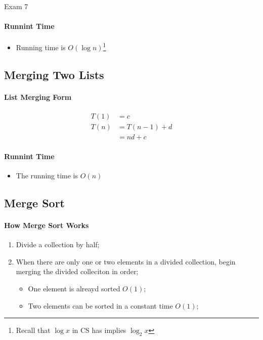 \documentclass{note}
\begin{document}
\begin{note}{Exam 7}
    \paragraph{Runnint Time}
    \begin{itemize}
        \item Running time is $ O \left( \log n \right) $\footnote{Recall that $ \log x $ in CS has implies $ \log_{2} x $}
    \end{itemize}

    \subsection{Merging Two Lists}

    \paragraph{List Merging Form}
    \begin{align*}
        T(1) &= c \\
        T(n) &= T \left( n - 1 \right) + d \\
        &= nd + c
    \end{align*}

    \paragraph{Runnint Time}
    \begin{itemize}
        \item The running time is $ O \left( n \right) $
    \end{itemize}

    \subsection{Merge Sort}

    \paragraph{How Merge Sort Works}
    \begin{enumerate}
        \item Divide a collection by half;
        \item When there are only one or two elements in a divided collection, begin merging the divided colleciton in order;
        \begin{itemize}
            \item One element is alreayd sorted $ O (1) $;
            \item Two elements can be sorted in a constant time $ O (1) $;
        \end{itemize}
    \end{enumerate}


\end{note}
\end{document}
